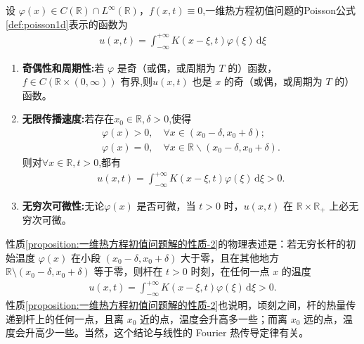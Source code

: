 \documentclass[../../main.tex]{subfiles}%
\begin{document}
\begin{proposition}\label{proposition:一维热方程初值问题解的性质}
设 $\varphi(x)\in C(\mathbb{R})\cap L^\infty(\mathbb{R})$，$f(x,t)\equiv 0$,一维热方程初值问题的Poisson公式\eqref{def:poisson1d}表示的函数为
\begin{align*}
u(x,t)=\int_{-\infty}^{+\infty}K(x-\xi,t)\varphi(\xi)\,\mathrm{d}\xi
\end{align*}
\begin{enumerate}[(1)]
\item \textbf{奇偶性和周期性:}若 $\varphi$ 是奇（或偶，或周期为 $T$ 的）函数，$f\in C(\mathbb{R}\times(0,\infty))$ 有界,则$u(x,t)$
也是 $x$ 的奇（或偶，或周期为 $T$ 的）函数。

\item\label{proposition:一维热方程初值问题解的性质-2} \textbf{无限传播速度:}若存在$x_0\in \mathbb{R},\delta >0$,使得
\begin{gather*}
\varphi \left( x \right) >0,\quad \forall x\in \left( x_0-\delta ,x_0+\delta \right) ;
\\
\varphi \left( x \right) =0,\quad \forall x\in \mathbb{R} \backslash \left( x_0-\delta ,x_0+\delta \right) .
\end{gather*}
则对$\forall x\in \mathbb{R},t>0$,都有
\begin{align*}
u(x,t)=\int_{-\infty}^{+\infty}K(x-\xi,t)\varphi(\xi)\,\mathrm{d}\xi>0.
\end{align*}

\item \textbf{无穷次可微性:}无论$\varphi(x)$ 是否可微，当 $t>0$ 时，$u(x,t)$ 在 $\mathbb{R}\times\mathbb{R}_+$ 上必无穷次可微。
\end{enumerate}
\end{proposition}
\begin{remark}
性质\ref{proposition:一维热方程初值问题解的性质-2}的物理表述是：若无穷长杆的初始温度 $\varphi(x)$ 在小段 $(x_0-\delta,x_0+\delta)$ 大于零，且在其他地方 $\mathbb{R}\setminus(x_0-\delta,x_0+\delta)$ 等于零，则杆在 $t>0$ 时刻，在任何一点 $x$ 的温度
\begin{align*}
u(x,t)=\int_{-\infty}^{+\infty}K(x-\xi,t)\varphi(\xi)\,\mathrm{d}\xi>0.
\end{align*}
性质\ref{proposition:一维热方程初值问题解的性质-2}也说明，顷刻之间，杆的热量传递到杆上的任何一点，且离 $x_0$ 近的点，温度会升高多一些；而离 $x_0$ 远的点，温度会升高少一些。当然，这个结论与线性的 Fourier 热传导定律有关。
\end{remark}
\end{document}
